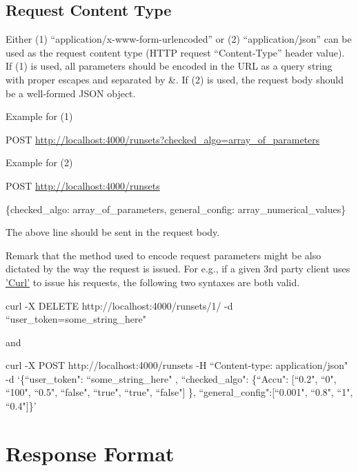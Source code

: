 \documentclass[a4paper,10pt]{scrartcl}
\begin{document}
\subsection{Request Content Type}
Either (1) ``application/x-www-form-urlencoded” or (2) ``application/json” can be used as the request content type (HTTP request “Content-Type” header value). 
If (1) is used, all parameters should be encoded in the URL as a query string with proper escapes and separated by \&. If (2) is used, the request body should 
be a well-formed JSON object. 

\begin{description}
 \item Example for (1)
 \item POST \href{http://localhost:4000/runsets?checked\_algo=array\_of\_parameters}{http://localhost:4000/runsets?checked\_algo=array\_of\_parameters}
 \item Example for (2)
 \item POST \href{http://localhost:4000/runsets}{http://localhost:4000/runsets}
 \item \{checked\_algo: array\_of\_parameters, general\_config: array\_numerical\_values\}
\end{description}
The above line should be sent in the request body.


Remark that the method used to encode request parameters might be also dictated by the way the request is issued. For e.g., if a given 3rd party client uses
\href{http://curl.haxx.se/}{'Curl'} to issue his requests, the following two syntaxes are both valid.
\begin{description}
 \item curl -X DELETE http://localhost:4000/runsets/1/ -d ``user\_token=some\_string\_here"\\
 \item and \\
 \item curl -X POST http://localhost:4000/runsets -H ``Content-type: application/json" -d `\{``user\_token": ``some\_string\_here" , ``checked\_algo": \{``Accu": [``0.2", ``0", ``100", ``0.5", ``false", ``true", ``true", ``false"] \}, ``general\_config":[``0.001", ``0.8", ``1", ``0.4"]\}' 
\end{description}
\section{Response Format}
\end{document}
